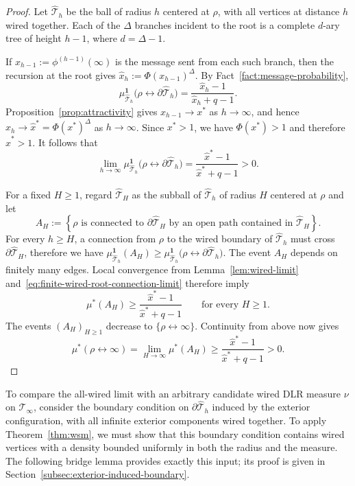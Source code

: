 \documentclass[11pt]{amsart}
\theoremstyle{plain}
\theoremstyle{definition}
\theoremstyle{remark}
\newcommand{\dreg}{\widehat {\mathcal T}_h}
\begin{document}
\begin{proof}
Let $\widehat{\mathcal T}_h$ be the ball of radius $h$ centered at $\rho$, with all vertices at distance $h$ wired together. Each of the $\Delta$ branches incident to the root is a complete $d$-ary tree of height $h-1$, where $d=\Delta-1$. 

If $x_{h-1}:=\phi^{(h-1)}(\infty)$ is the message sent from each such branch, then the recursion at the root gives $\widehat x_h:=\Phi(x_{h-1})^\Delta$. 
By Fact~\ref{fact:message-probability},
\[
    \mu_{\widehat{\mathcal T}_h}^{\mathbf 1}
    \bigl(\rho\leftrightarrow\partial\widehat{\mathcal T}_h\bigr)
    =
    \frac{\widehat x_h-1}{\widehat x_h+q-1}.
\]
Proposition~\ref{prop:attractivity} gives $x_{h-1}\to x^*$ as $h\to\infty$, and hence $\widehat x_h\longrightarrow\widehat x^*=\Phi(x^*)^\Delta$ as $h\to\infty$. Since $x^*>1$, we have $\Phi(x^*)>1$ and therefore $\widehat x^*>1$. It follows that
\begin{equation}
\label{eq:finite-wired-root-connection-limit}
    \lim_{h\to\infty}
    \mu_{\widehat{\mathcal T}_h}^{\mathbf 1}
    \bigl(\rho\leftrightarrow\partial\widehat{\mathcal T}_h\bigr)
    =
    \frac{\widehat x^*-1}{\widehat x^*+q-1}
    >0.
\end{equation}

For a fixed $H\ge1$, regard $\widehat{\mathcal T}_H$ as the subball of $\dreg$ of radius $H$ centered at $\rho$ and let
\[
    A_H
    :=
    \left\{
        \rho\text{ is connected to }\partial\widehat{\mathcal T}_H
        \text{ by an open path contained in }\widehat{\mathcal T}_H
    \right\}.
\]
For every $h\ge H$, a connection from $\rho$ to the wired boundary of $\widehat{\mathcal T}_h$ must cross $\partial\widehat{\mathcal T}_H$, therefore we have
$
    \mu_{\widehat{\mathcal T}_h}^{\mathbf 1}(A_H)
    \ge
    \mu_{\widehat{\mathcal T}_h}^{\mathbf 1}
    \bigl(\rho\leftrightarrow\partial\widehat{\mathcal T}_h\bigr).
$
The event $A_H$ depends on finitely many edges. Local convergence from Lemma~\ref{lem:wired-limit} and~\eqref{eq:finite-wired-root-connection-limit} therefore imply
\[
    \mu^*(A_H)
    \ge
    \frac{\widehat x^*-1}{\widehat x^*+q-1}
    \qquad
    \text{for every }H\ge1.
\]
The events $(A_H)_{H\ge1}$ decrease to $\{\rho\leftrightarrow\infty\}$. Continuity from above now gives
\[
    \mu^*(\rho\leftrightarrow\infty)
    =
    \lim_{H\to\infty}\mu^*(A_H)
    \ge
    \frac{\widehat x^*-1}{\widehat x^*+q-1}
    >0.
\]
\end{proof}

To compare the all-wired limit with an arbitrary candidate wired DLR measure $\nu$ on $\mathcal T_\infty$, consider the boundary condition on $\partial\dreg$ induced by the exterior configuration, with all infinite exterior components wired together. To apply Theorem~\ref{thm:wsm}, we must show that this boundary condition contains wired vertices with a density bounded uniformly in both the radius and the measure. The following bridge lemma provides exactly this input; its proof is given in Section~\ref{subsec:exterior-induced-boundary}.
\end{document}
